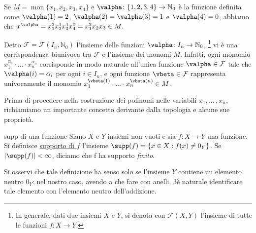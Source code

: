 \begin{exm}
Se $M=\operatorname{mon}\{x_1,x_2,x_3,x_4\}$ e $\valpha\colon \{1,2,3,4\}\to \mathbb{N}_0$ è la funzione definita 
come $\valpha(1)=2$, $\valpha(2)=\valpha(3)=1$ e $\valpha(4)=0$, abbiamo che $x^{\valpha}=x_1^2 x_2^1 x_3^1 x_4^0=x_1^2 x_2 x_3\in M.$
\end{exm}

\noindent Detto $\mathcal{F}=\mathcal{F}(I_n, \mathbb{N}_0)$ l'insieme delle funzioni $\valpha \colon I_n\to\mathbb{N}_0$,
\footnote{In generale, dati due insiemi $X$ e $Y$, si denota con $\mathcal{F}(X,Y)$ l'insieme di tutte le funzioni $f\colon X\to Y$.} 
vi è una corrispondenza biunivoca tra $\mathcal{F}$ e l'insieme dei monomi $M$. 
Infatti, ogni monomio $x_1^{\alpha_1}\cdot ...\cdot x_n^{\alpha_n}$ corrisponde in modo naturale all'unica funzione 
$\valpha\in\mathcal{F}$ tale che $\valpha(i)=\alpha_i$ per ogni $i\in I_n$, e ogni funzione $\vbeta \in\mathcal{F}$ 
rappresenta univocamente il monomio $x_1^{\vbeta(1)}\cdot ... \cdot x_n^{\vbeta(n)}\in M$.

\vspace{1.5mm}

\noindent Prima di procedere nella costruzione dei polinomi nelle variabili $x_1,...\,,x_n$, 
richiamiamo un importante concetto derivante dalla topologia e alcune sue proprietà.

\begin{defn}{supp di una funzione}
Siano $X$ e $Y$ insiemi non vuoti e sia $f\colon X\to Y$ una funzione. Si definisce \underline{supporto di $f$} l'insieme 
$\supp(f)=\left\{x\in X: f(x)\neq 0_Y \right\}$. Se $|\supp(f)|<\infty$, diciamo che f ha supporto \emph{finito}.
\end{defn}

\noindent Si osservi che tale definizione ha senso solo se 
l'insieme $Y$ contiene un elemento neutro $0_Y$: nel nostro caso, avendo a che fare con anelli, 
3è naturale identificare tale elemento con l'elemento neutro dell'addizione.

